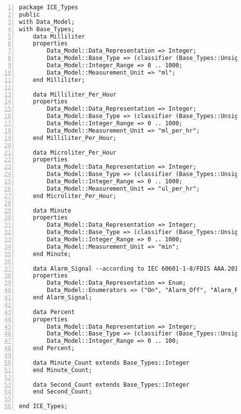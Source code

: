 \newpage

\singlespacing
\begin{lstlisting}[language=aadl, gobble=0, numbers=left, caption={\lstinline{ICE_Types} package}, label={listing:aadl:ice_types}]
package ICE_Types
public
with Data_Model;
with Base_Types;
	data Milliliter
	properties
		Data_Model::Data_Representation => Integer;
		Data_Model::Base_Type => (classifier (Base_Types::Unsigned_16)); --two bytes for 0-1000 ml
		Data_Model::Integer_Range => 0 .. 1000;
		Data_Model::Measurement_Unit => "ml";
	end Milliliter;

	data Milliliter_Per_Hour
	properties
		Data_Model::Data_Representation => Integer;
		Data_Model::Base_Type => (classifier (Base_Types::Unsigned_16)); --two bytes for 0-1000 ml/hr
		Data_Model::Integer_Range => 0 .. 1000;
		Data_Model::Measurement_Unit => "ml_per_hr";
	end Milliliter_Per_Hour;

	data Microliter_Per_Hour
	properties
		Data_Model::Data_Representation => Integer;
		Data_Model::Base_Type => (classifier (Base_Types::Unsigned_16)); --two bytes for 0-1000 ul/hr
		Data_Model::Integer_Range => 0 .. 1000;
		Data_Model::Measurement_Unit => "ul_per_hr";
	end Microliter_Per_Hour;

	data Minute
	properties
		Data_Model::Data_Representation => Integer;
		Data_Model::Base_Type => (classifier (Base_Types::Unsigned_16)); --two bytes for 0-1000 minutes
		Data_Model::Integer_Range => 0 .. 1000;
		Data_Model::Measurement_Unit => "min";
	end Minute;

	data Alarm_Signal --according to IEC 60601-1-8/FDIS AAA.201.8 ALARM SIGNAL inactivation states
	properties
		Data_Model::Data_Representation => Enum;
		Data_Model::Enumerators => ("On", "Alarm_Off", "Alarm_Paused", "Audio_Off", "Audio_Paused");
	end Alarm_Signal;

	data Percent
	properties
		Data_Model::Data_Representation => Integer;
		Data_Model::Base_Type => (classifier (Base_Types::Unsigned_8)); --one byte for 0-100 percent
		Data_Model::Integer_Range => 0 .. 100;
	end Percent;

	data Minute_Count extends Base_Types::Integer
	end Minute_Count;

	data Second_Count extends Base_Types::Integer
	end Second_Count;

end ICE_Types;
\end{lstlisting} 
\doublespacing

\newpage

